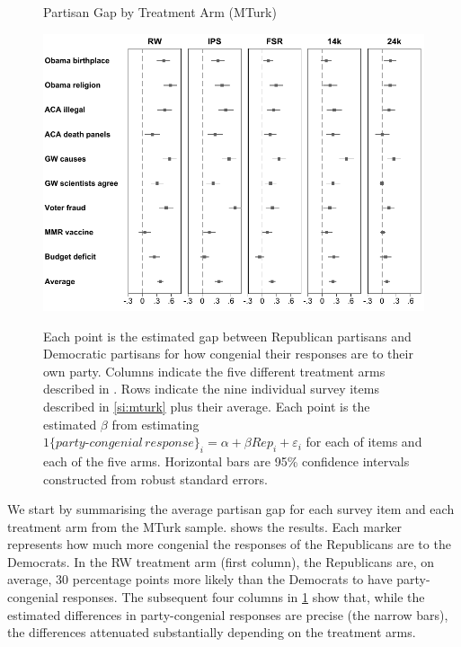 \documentclass[12pt, letterpaper]{article}
\begin{document}
\begin{center}
	\begin{figure}[t]
		\centering
		\caption{Partisan Gap by Treatment Arm (MTurk)}
		\includegraphics[width=\textwidth]{../figs/partisan-gap-by-item-arm.pdf}
		\label{fig:partisangaps-mturk}
		\caption*{\footnotesize 
			Each point is the estimated gap between Republican partisans and Democratic partisans for how congenial their responses are to their own party.
			Columns indicate the five different treatment arms described in . Rows indicate the nine individual survey items described in \cref{si:mturk} plus their average.
			Each point is the estimated $\beta$ from estimating $1\{party\text{-}congenial\, response\}_i = \alpha + \beta Rep_i + \varepsilon_i$ for each of items and each of the five arms.			
			Horizontal bars are 95\% confidence intervals constructed from robust standard errors.
		}
	\end{figure}
\end{center}

We start by summarising the average partisan gap for each survey item and each treatment arm from the MTurk sample.
 shows the results. Each marker represents how much more congenial the responses of the Republicans are to the Democrats.
In the RW treatment arm (first column), the Republicans are, on average, 30 percentage points more likely than the Democrats to have party-congenial responses. The subsequent four columns in \cref{fig:partisangaps-mturk} show that, while the estimated differences in party-congenial responses are precise (the narrow bars), the differences attenuated substantially depending on the treatment arms. 
\end{document}
